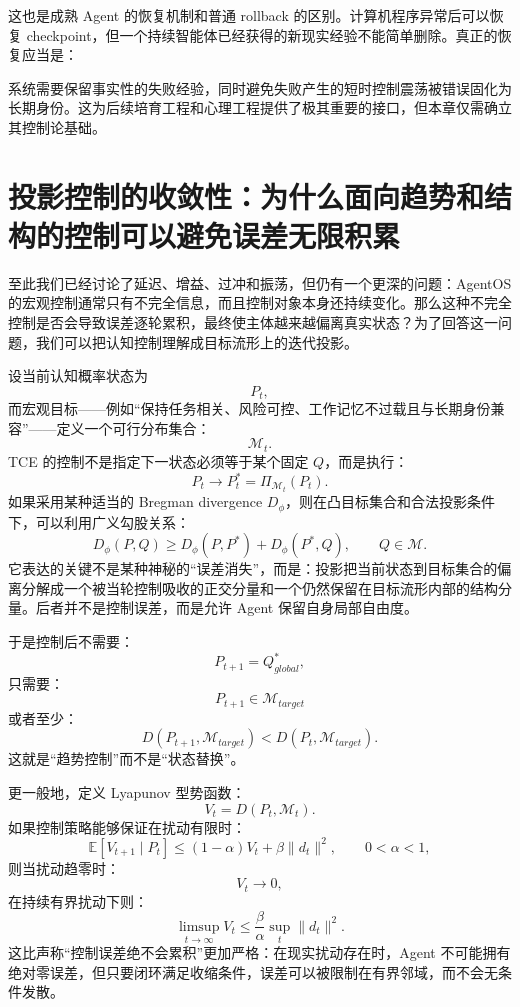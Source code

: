 这也是成熟 Agent 的恢复机制和普通 rollback 的区别。计算机程序异常后可以恢复 checkpoint，但一个持续智能体已经获得的新现实经验不能简单删除。真正的恢复应当是：
\begin{statementbox}
\centering
{}
\end{statementbox}
系统需要保留事实性的失败经验，同时避免失败产生的短时控制震荡被错误固化为长期身份。这为后续培育工程和心理工程提供了极其重要的接口，但本章仅需确立其控制论基础。

\section{投影控制的收敛性：为什么面向趋势和结构的控制可以避免误差无限积累}

至此我们已经讨论了延迟、增益、过冲和振荡，但仍有一个更深的问题：AgentOS 的宏观控制通常只有不完全信息，而且控制对象本身还持续变化。那么这种不完全控制是否会导致误差逐轮累积，最终使主体越来越偏离真实状态？为了回答这一问题，我们可以把认知控制理解成目标流形上的迭代投影。

设当前认知概率状态为
\[
P_t,
\]
而宏观目标——例如“保持任务相关、风险可控、工作记忆不过载且与长期身份兼容”——定义一个可行分布集合：
\[
\mathcal M_t.
\]
TCE 的控制不是指定下一状态必须等于某个固定 $Q$，而是执行：
\[
P_t
\rightarrow
P_t^{*}
=
\Pi_{\mathcal M_t}(P_t).
\]
如果采用某种适当的 Bregman divergence $D_{\phi}$，则在凸目标集合和合法投影条件下，可以利用广义勾股关系：
\[
D_{\phi}(P,Q)
\ge
D_{\phi}(P,P^{*})
+
D_{\phi}(P^{*},Q),
\qquad
Q\in\mathcal M.
\]
它表达的关键不是某种神秘的“误差消失”，而是：投影把当前状态到目标集合的偏离分解成一个被当轮控制吸收的正交分量和一个仍然保留在目标流形内部的结构分量。后者并不是控制误差，而是允许 Agent 保留自身局部自由度。

于是控制后不需要：
\[
P_{t+1}
=
Q_{global}^{*},
\]
只需要：
\[
P_{t+1}
\in
\mathcal M_{target}
\]
或者至少：
\[
D(P_{t+1},\mathcal M_{target})
<
D(P_t,\mathcal M_{target}).
\]
这就是“趋势控制”而不是“状态替换”。

更一般地，定义 Lyapunov 型势函数：
\[
V_t
=
D
\left(
P_t,
\mathcal M_t
\right).
\]
如果控制策略能够保证在扰动有限时：
\[
\mathbb E
[
V_{t+1}
\mid
P_t
]
\le
(1-\alpha)V_t
+
\beta\|d_t\|^2,
\qquad
0<\alpha<1,
\]
则当扰动趋零时：
\[
V_t\rightarrow0,
\]
在持续有界扰动下则：
\[
\limsup_{t\rightarrow\infty}
V_t
\le
\frac{\beta}{\alpha}
\sup_t\|d_t\|^2.
\]
这比声称“控制误差绝不会累积”更加严格：在现实扰动存在时，Agent 不可能拥有绝对零误差，但只要闭环满足收缩条件，误差可以被限制在有界邻域，而不会无条件发散。


